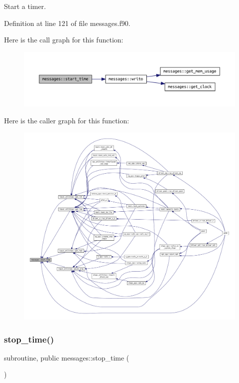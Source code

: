 Start a timer. 



Definition at line 121 of file messages.\+f90.

Here is the call graph for this function\+:\nopagebreak
\begin{figure}[H]
\begin{center}
\leavevmode
\includegraphics[width=350pt]{namespacemessages_a84d5988f3ea5ca8dc2834032f896ae90_cgraph}
\end{center}
\end{figure}
Here is the caller graph for this function\+:\nopagebreak
\begin{figure}[H]
\begin{center}
\leavevmode
\includegraphics[width=350pt]{namespacemessages_a84d5988f3ea5ca8dc2834032f896ae90_icgraph}
\end{center}
\end{figure}
\mbox{\label{namespacemessages_aed343894ae4a28ad6dfbd1d39aac64ff}} 
\subsubsection{\texorpdfstring{stop\+\_\+time()}{stop\_time()}}
{\footnotesize\ttfamily subroutine, public messages\+::stop\+\_\+time (\begin{DoxyParamCaption}{ }\end{DoxyParamCaption})}



